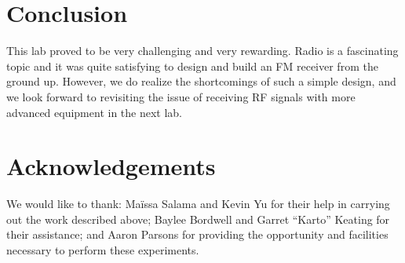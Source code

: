 \documentclass[11pt]{article}
\begin{document}
\section{Conclusion}
This lab proved to be very challenging and very rewarding. Radio is a fascinating topic and it was quite satisfying to design and build an FM receiver from the ground up. However, we do realize the shortcomings of such a simple design, and we look forward to revisiting the issue of receiving RF signals with more advanced equipment in the next lab.

\section{Acknowledgements}
We would like to thank: Ma\"{i}ssa Salama and Kevin Yu for their help in carrying out the work described above; Baylee Bordwell and Garret ``Karto'' Keating for their assistance; and Aaron Parsons for providing the opportunity and facilities necessary to perform these experiments.
\end{document}
